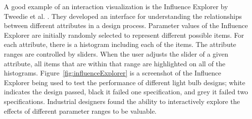 A good example of an interaction visualization is the Influence Explorer by Tweedie et al. \cite{tweedie1995}.  They developed an interface for understanding the relationships between different attributes in a design process.  Parameter values of the Influence Explorer are initially randomly selected to represent different possible items.  For each attribute, there is a histogram including each of the items.  The attribute ranges are controlled by sliders.  When the user adjusts the slider of a given attribute, all items that are within that range are highlighted on all of the histograms.  Figure~\ref{fig:influenceExplorer} is a screenshot of the Influence Explorer being used to test the performance of different light bulb designs; white indicates the design passed, black it failed one specification, and grey it failed two specifications.  Industrial designers found the ability to interactively explore the effects of different parameter ranges to be valuable.
